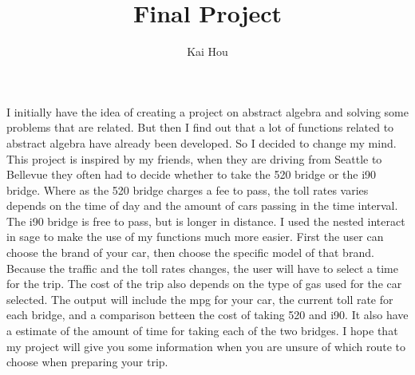 \documentclass{article}
\title{Final Project}
\author{Kai Hou}
\begin{document}
\maketitle
I initially have the idea of creating a project on abstract algebra and solving some problems that are related. But then I find out that a lot of functions related to abstract algebra have already been developed. So I decided to change my mind. This project is inspired by my friends, when they are driving from Seattle to Bellevue they often had to decide whether to take the 520 bridge or the i90 bridge. Where as the 520 bridge charges a fee to pass, the toll rates varies depends on the time of day and the amount of cars passing in the time interval. The i90 bridge is free to pass, but is longer in distance.
 I used the nested interact in sage to make the use of my functions much more easier.
First the user can choose the brand of your car, then choose the specific model of that brand. Because the traffic and the toll rates changes, the user will have to select a time for the trip. The cost of the trip also depends on the type of gas used for the car selected.
 The output will include the mpg for your car, the current toll rate for each bridge, and a comparison betteen the cost of taking 520 and i90. It also have a estimate of the amount of time for taking each of the two bridges. I hope that my project will give you some information when you are unsure of which route to choose when preparing your trip.
\end{document}
